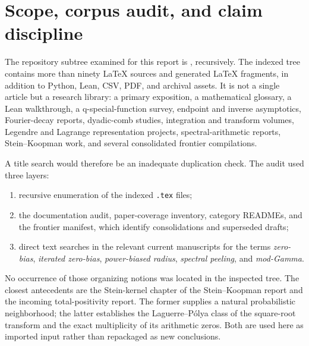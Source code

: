 \documentclass[11pt,oneside]{article}
\theoremstyle{definition}
\theoremstyle{remark}
\begin{document}
\begin{abstract}
Finally, the tower Gaussianizes every compact symmetric law whose support
reaches its endpoints:
\(
\sqrt{2m}\,Y^{\langle m\rangle}\Rightarrow N(0,1)
\).
For the Rvachev law the convergence is logarithmically slow.  The exact
negative-Laplace decomposition of the Fabius law yields a phase-dependent
mod-Gamma law for $2m(1-R_m)$ and the sharp transport scale
\[
 W_1\!\left(\sqrt{2m}\,Y^{\langle m\rangle},N(0,1)\right)
 \sim \sqrt{\frac2\pi}\,
       \frac{\log(2m)}{2m\log2}.
\]
The report ends with conjectures on spectral non-reappearance, Bessel--Airy
zero transitions, occupancy limit shapes, phase-resolved all-order expansions,
and a concrete Lean formalization program.  A fully commented Python program
reproduces the tables, exact rational checks, Monte Carlo occupancy sampler,
and figures.
\end{abstract}

\tableofcontents
\newpage

\section{Scope, corpus audit, and claim discipline}
\label{sec:scope}

The repository subtree examined for this report is
, recursively.  The indexed tree contains
more than ninety LaTeX sources and generated LaTeX fragments, in addition to
Python, Lean, CSV, PDF, and archival assets.  It is not a single article but a
research library: a primary exposition, a mathematical glossary, a Lean
walkthrough, a q-special-function survey, endpoint and inverse asymptotics,
Fourier-decay reports, dyadic-comb studies, integration and transform volumes,
Legendre and Lagrange representation projects, spectral-arithmetic reports,
Stein--Koopman work, and several consolidated frontier compilations.

A title search would therefore be an inadequate duplication check.  The audit
used three layers:
\begin{enumerate}
\item recursive enumeration of the indexed \texttt{.tex} files;
\item the documentation audit, paper-coverage inventory, category READMEs, and
      the frontier manifest, which identify consolidations and superseded
      drafts;
\item direct text searches in the relevant current manuscripts for the terms
      \emph{zero-bias}, \emph{iterated zero-bias}, \emph{power-biased radius},
      \emph{spectral peeling}, and \emph{mod-Gamma}.
\end{enumerate}
No occurrence of those organizing notions was located in the inspected tree.
The closest antecedents are the Stein-kernel chapter of the
Stein--Koopman report and the incoming total-positivity report.  The former
supplies a natural probabilistic neighborhood; the latter establishes the
Laguerre--P\'olya class of the square-root transform and the exact multiplicity
of its arithmetic zeros.  Both are used here as imported input rather than
repackaged as new conclusions.
\end{document}
